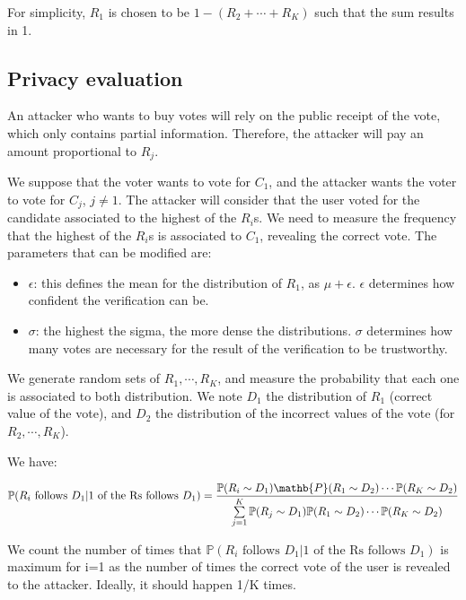\documentclass{article}
\begin{document}
For simplicity, $R_1$ is chosen to be $1-(R_2+\cdots+R_K)$ such that the sum results in 1.


\subsection{Privacy evaluation}

An attacker who wants to buy votes will rely on the public receipt of the vote, which only contains partial information. Therefore, the attacker will pay an amount proportional to $R_j$.

We suppose that the voter wants to vote for $C_1$, and the attacker wants the voter to vote for $C_j$, $j\neq 1$. The attacker will consider that the user voted for the candidate associated to the highest of the $R_i$s. We need to measure the frequency that the highest of the $R_i$s is associated to $C_1$, revealing the correct vote. The parameters that can be modified are:
\begin{itemize}
    \item $\epsilon$: this defines the mean for the distribution of $R_1$, as $\mu + \epsilon$. $\epsilon$ determines how confident the verification can be.
    \item $\sigma$: the highest the sigma, the more dense the distributions. $\sigma$ determines how many votes are necessary for the result of the verification to be trustworthy.
\end{itemize}

We generate random sets of $R_1, \cdots, R_K$, and measure the probability that each one is associated to both distribution. We note $D_1$ the distribution of $R_1$ (correct value of the vote), and $D_2$ the distribution of the incorrect values of the vote (for $R_2, \cdots, R_K$).

We have:

$\mathbb{P}(R_i\text{ follows }D_1 | \text{1 of the Rs follows }D_1)=\dfrac{\mathbb{P}(R_i\sim D_1)\mathb{P}(R_1 \sim D_2)\cdots \mathbb{P}(R_K \sim D_2)}{\sum\limits_{j=1}^{K}\mathbb{P}(R_j\sim D_1)\mathbb{P}(R_1 \sim D_2)\cdots \mathbb{P}(R_K \sim D_2)}$

We count the number of times that $\mathbb{P}(R_i\text{ follows }D_1 | \text{1 of the Rs follows }D_1)$ is maximum for i=1 as the number of times the correct vote of the user is revealed to the attacker. Ideally, it should happen 1/K times.
\end{document}
